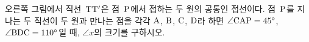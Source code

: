 \noindent\begin{minipage}[t]{0.58\linewidth}\vspace{0pt}\raggedright 오른쪽 그림에서 직선~$\mathrm{TT'}$은 점~$\mathrm{P}$에서 접하는 두 원의 공통인 접선이다. 점~$\mathrm{P}$를 지나는 두 직선이 두 원과 만나는 점을 각각 $\mathrm{A}$, $\mathrm{B}$, $\mathrm{C}$, $\mathrm{D}$라 하면 $\angle\mathrm{CAP}=45^\circ$, $\angle\mathrm{BDC}=110^\circ$일 때, $\angle x$의 크기를 구하시오.\end{minipage}\hfill\begin{minipage}[t]{0.4\linewidth}\vspace{0pt}\centering \resizebox{\ifdim\width>\linewidth\linewidth\else\width\fi}{!}{}\end{minipage}\par
